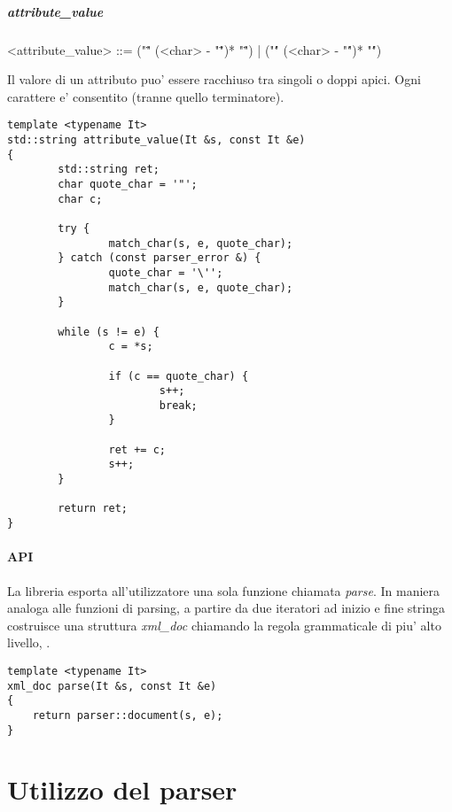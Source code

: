 \documentclass[italian,a4paper]{article}
\begin{document}
\subsubsection{attribute\_value}

\begin{grammar}
	<attribute\_value> ::= ("\"" (<char> - "\"")* "\"") | ("\'" (<char> - "\'")* "\'")
\end{grammar}

Il valore di un attributo puo' essere racchiuso tra singoli o doppi apici. Ogni
carattere e' consentito (tranne quello terminatore).

\begin{verbatim}
template <typename It>
std::string attribute_value(It &s, const It &e)
{
        std::string ret;
        char quote_char = '"';
        char c;

        try {
                match_char(s, e, quote_char);
        } catch (const parser_error &) {
                quote_char = '\'';
                match_char(s, e, quote_char);
        }

        while (s != e) {
                c = *s;

                if (c == quote_char) {
                        s++;
                        break;
                }

                ret += c;
                s++;
        }

        return ret;
}
\end{verbatim}

\subsection{API}

La libreria esporta all'utilizzatore una sola funzione chiamata \emph{parse}. In
maniera analoga alle funzioni di parsing, a partire da due iteratori ad inizio e
fine stringa costruisce una struttura \emph{xml\_doc} chiamando la regola
grammaticale di piu' alto livello, .

\begin{verbatim}
template <typename It>
xml_doc parse(It &s, const It &e)
{
	return parser::document(s, e);
}
\end{verbatim}

\part{Utilizzo del parser}
\end{document}
